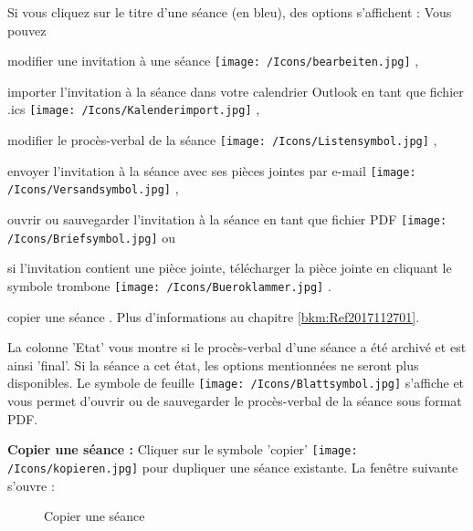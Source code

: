 Si vous cliquez sur le titre d'une séance (en bleu), des options s'affichent  : Vous pouvez 

\begin{compactitem}
\item modifier une invitation à une séance \texttt{[image: /Icons/bearbeiten.jpg]} ,
\item importer l'invitation à la séance dans votre calendrier Outlook en tant que fichier .ics \texttt{[image: /Icons/Kalenderimport.jpg]} ,
\item modifier le procès-verbal de la séance \texttt{[image: /Icons/Listensymbol.jpg]} ,
\item envoyer l'invitation à la séance avec ses pièces jointes par e-mail \texttt{[image: /Icons/Versandsymbol.jpg]} ,
\item ouvrir ou sauvegarder l'invitation à la séance en tant que fichier PDF \texttt{[image: /Icons/Briefsymbol.jpg]}  ou 
\item si l'invitation contient une pièce jointe, télécharger la pièce jointe en cliquant le symbole trombone \texttt{[image: /Icons/Bueroklammer.jpg]} .
\item copier une séance . Plus d'informations au chapitre \ref{bkm:Ref2017112701}.
\end{compactitem}
	
La colonne 'Etat'  vous montre si le procès-verbal d'une séance a été archivé et est ainsi 'final'. Si la séance a cet état, les options mentionnées ne seront plus disponibles. Le symbole de feuille \texttt{[image: /Icons/Blattsymbol.jpg]} s'affiche et vous permet d'ouvrir ou de sauvegarder le procès-verbal de la séance sous format PDF.
	
\vspace{\baselineskip}
\label{bkm:Ref2017112701}

\textbf{Copier une séance :} Cliquer sur le symbole 'copier' \texttt{[image: /Icons/kopieren.jpg]}  pour dupliquer une séance existante. La fenêtre suivante s'ouvre : 

\begin{figure}[H]
\caption{Copier une séance}
\end{figure}

